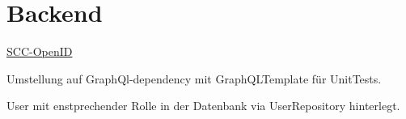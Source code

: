 \section{Backend}


    \begin{frame}%
        \href{https://www.scc.kit.edu/dienste/openid-connect.php}{SCC-OpenID}
    \end{frame}

    \begin{frame}%
        Umstellung auf GraphQl-dependency mit GraphQLTemplate für UnitTests. 
    \end{frame}

    \begin{frame}%
        User mit enstprechender Rolle in der Datenbank via UserRepository hinterlegt.
    \end{frame}